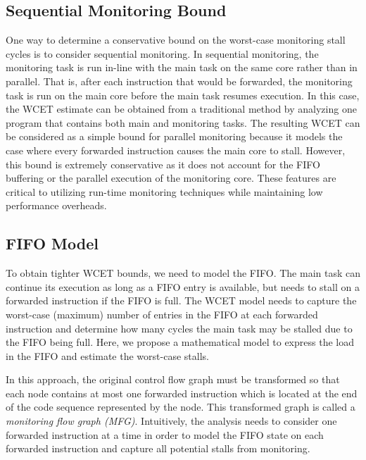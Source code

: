 \subsection{Sequential Monitoring Bound}
\label{sec:monitoring_wcet.wcet.sequential}

One way to determine a conservative bound on the worst-case monitoring stall
cycles is to consider sequential monitoring.  In sequential monitoring, the
monitoring task is run in-line with the main task on the same core rather than
in parallel. That is, after each instruction that would be forwarded, the
monitoring task is run on the main core before the main task resumes execution.
In this case, the WCET estimate can be obtained from a traditional method by
analyzing one program that contains both main and monitoring tasks.  The
resulting WCET can be considered as a simple bound for parallel monitoring
because it models the case where every forwarded instruction causes the main
core to stall.  However, this bound is extremely conservative as it does not
account for the FIFO buffering or the parallel execution of the monitoring
core. These features are critical to utilizing run-time monitoring techniques
while maintaining low performance overheads.

\subsection{FIFO Model}
\label{sec:monitoring_wcet.wcet.model}

To obtain tighter WCET bounds, we need to model the FIFO.  The main task can
continue its execution as long as a FIFO entry is available, but needs to stall
on a forwarded instruction if the FIFO is full. The WCET model needs to capture
the worst-case (maximum) number of entries in the FIFO at each forwarded
instruction and determine how many cycles the main task may be stalled due to
the FIFO being full. Here, we propose a mathematical model to express the load
in the FIFO and estimate the worst-case stalls.

In this approach, the original control flow graph must be transformed so that
each node contains at most one forwarded instruction which is located at the
end of the code sequence represented by the node.  This transformed graph is
called a {\em monitoring flow graph (MFG)}.  Intuitively, the analysis needs to
consider one forwarded instruction at a time in order to model the FIFO state
on each forwarded instruction and capture all potential stalls from monitoring. 

